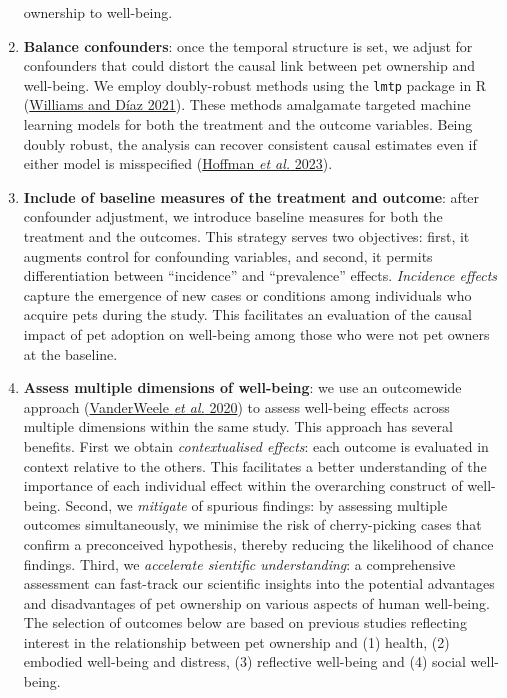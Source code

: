\documentclass[
  singlecolumn,
  9pt]{article}
\begin{document}
\begin{enumerate}
  ownership to well-being.
\item
  \textbf{Balance confounders}: once the temporal structure is set, we
  adjust for confounders that could distort the causal link between pet
  ownership and well-being. We employ doubly-robust methods using the
  \texttt{lmtp} package in R (\hyperref[ref-williams2021]{Williams and
  Díaz 2021}). These methods amalgamate targeted machine learning models
  for both the treatment and the outcome variables. Being doubly robust,
  the analysis can recover consistent causal estimates even if either
  model is misspecified (\hyperref[ref-hoffman2023]{Hoffman \emph{et
  al.} 2023}).
\item
  \textbf{Include of baseline measures of the treatment and outcome}:
  after confounder adjustment, we introduce baseline measures for both
  the treatment and the outcomes. This strategy serves two objectives:
  first, it augments control for confounding variables, and second, it
  permits differentiation between ``incidence'' and ``prevalence''
  effects. \emph{Incidence effects} capture the emergence of new cases
  or conditions among individuals who acquire pets during the study.
  This facilitates an evaluation of the causal impact of pet adoption on
  well-being among those who were not pet owners at the baseline.
\item
  \textbf{Assess multiple dimensions of well-being}: we use an
  outcomewide approach (\hyperref[ref-vanderweele2020]{VanderWeele
  \emph{et al.} 2020}) to assess well-being effects across multiple
  dimensions within the same study. This approach has several benefits.
  First we obtain \emph{contextualised effects}: each outcome is
  evaluated in context relative to the others. This facilitates a better
  understanding of the importance of each individual effect within the
  overarching construct of well-being. Second, we \emph{mitigate} of
  spurious findings: by assessing multiple outcomes simultaneously, we
  minimise the risk of cherry-picking cases that confirm a preconceived
  hypothesis, thereby reducing the likelihood of chance findings. Third,
  we \emph{accelerate sientific understanding}: a comprehensive
  assessment can fast-track our scientific insights into the potential
  advantages and disadvantages of pet ownership on various aspects of
  human well-being. The selection of outcomes below are based on
  previous studies reflecting interest in the relationship between pet
  ownership and (1) health, (2) embodied well-being and distress, (3)
  reflective well-being and (4) social well-being.

\end{enumerate}
\end{document}
